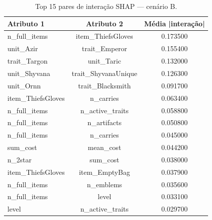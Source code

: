 \begin{table}[htbp]
\caption{Top 15 pares de interação SHAP — cenário B.}
\label{tab:intertB}
\centering
\small
\begin{tabular}{lcc}
\toprule
Atributo 1 & Atributo 2 & Média |interação| \\
\midrule
n\_full\_items & item\_ThiefsGloves & 0.173500 \\
unit\_Azir & trait\_Emperor & 0.155400 \\
trait\_Targon & unit\_Taric & 0.132000 \\
unit\_Shyvana & trait\_ShyvanaUnique & 0.126300 \\
unit\_Ornn & trait\_Blacksmith & 0.091700 \\
item\_ThiefsGloves & n\_carries & 0.063400 \\
n\_full\_items & n\_active\_traits & 0.058800 \\
n\_full\_items & n\_artifacts & 0.050800 \\
n\_full\_items & n\_carries & 0.045000 \\
sum\_cost & mean\_cost & 0.044200 \\
n\_2star & sum\_cost & 0.038000 \\
item\_ThiefsGloves & item\_EmptyBag & 0.037900 \\
n\_full\_items & n\_emblems & 0.035600 \\
n\_full\_items & level & 0.033100 \\
level & n\_active\_traits & 0.029700 \\
\bottomrule
\end{tabular}
\end{table}
